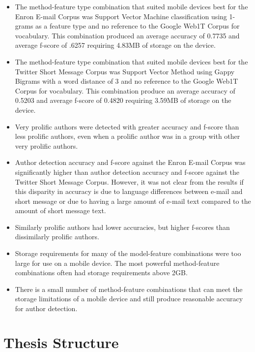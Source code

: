 \begin{itemize} 
	\item The method-feature type combination that suited mobile devices best for the Enron E-mail Corpus was Support Vector Machine classification using 1-grams as a feature type and no reference to the Google Web1T Corpus for vocabulary.  This combination produced an average accuracy of 0.7735 and average f-score of .6257 requiring 4.83MB of storage on the device.
	\item The method-feature type combination that suited mobile devices best for the Twitter Short Message Corpus was Support Vector Method using Gappy Bigrams with a word distance of 3 and no reference to the Google Web1T Corpus for vocabulary. This combination produce an average accuracy of 0.5203 and average f-score of 0.4820 requiring 3.59MB of storage on the device.
	\item Very prolific authors were detected with greater accuracy and f-score than less prolific authors, even when a prolific author was in a group with other very prolific authors.
	\item Author detection accuracy and f-score against the Enron E-mail Corpus was significantly higher than author detection accuracy and f-score against the Twitter Short Message Corpus. However, it was not clear from the results if this disparity in accuracy is due to language differences between e-mail and short message or due to having a large amount of e-mail text compared to the amount of short message text.
	\item Similarly prolific authors had lower accuracies, but higher f-scores than dissimilarly prolific authors.    
	\item Storage requirements for many of the model-feature combinations were too large for use on a mobile device.  The most powerful method-feature combinations often had storage requirements above 2GB.
	\item There is a small number of method-feature combinations that can meet the storage limitations of a mobile device and still produce reasonable accuracy for author detection.
\end{itemize}
	

\section{Thesis Structure}
